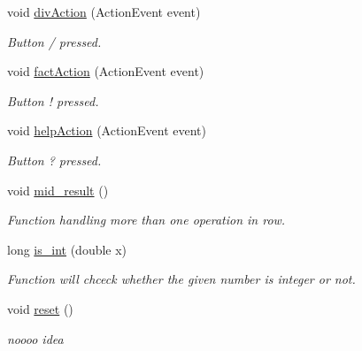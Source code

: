 \begin{DoxyCompactItemize}
void \hyperlink{classGUI__Controller_aa8ff04e83edf0943671173ccb7fcb716}{div\+Action} (Action\+Event event)
\begin{DoxyCompactList}\small\item\em Button \textquotesingle{}/\textquotesingle{} pressed. \end{DoxyCompactList}\item 
void \hyperlink{classGUI__Controller_a254bda9a37fb413e27572c045b6329f6}{fact\+Action} (Action\+Event event)
\begin{DoxyCompactList}\small\item\em Button \textquotesingle{}!\textquotesingle{} pressed. \end{DoxyCompactList}\item 
void \hyperlink{classGUI__Controller_aeaa83c7bf60a12582636385571d1241a}{help\+Action} (Action\+Event event)
\begin{DoxyCompactList}\small\item\em Button \textquotesingle{}?\textquotesingle{} pressed. \end{DoxyCompactList}\item 
\mbox{\label{classGUI__Controller_a152911421c341bb77bfa6e4e1d227d79}} 
void \hyperlink{classGUI__Controller_a152911421c341bb77bfa6e4e1d227d79}{mid\+\_\+result} ()
\begin{DoxyCompactList}\small\item\em Function handling more than one operation in row. \end{DoxyCompactList}\item 
long \hyperlink{classGUI__Controller_aff1ce595ea2abf5309f8225126e912db}{is\+\_\+int} (double x)
\begin{DoxyCompactList}\small\item\em Function will chceck whether the given number is integer or not. \end{DoxyCompactList}\item 
\mbox{\label{classGUI__Controller_ac879b351de7c6f032825558ee179237e}} 
void \hyperlink{classGUI__Controller_ac879b351de7c6f032825558ee179237e}{reset} ()
\begin{DoxyCompactList}\small\item\em noooo idea \end{DoxyCompactList}\end{DoxyCompactItemize}
